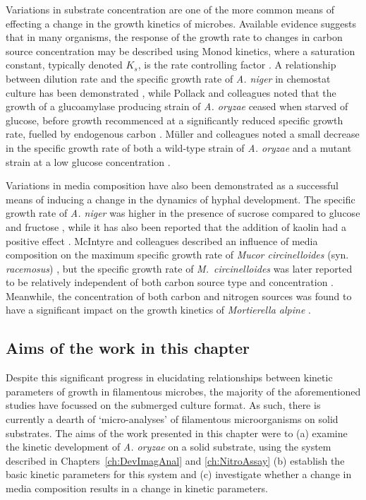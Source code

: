 Variations in substrate concentration are one of the more common means of effecting a change in the growth kinetics of microbes. Available evidence suggests that in many organisms, the response of the growth rate to changes in carbon source concentration may be described using Monod kinetics, where a saturation constant, typically denoted $K_s$, is the rate controlling factor \cite{spohr1998}. A relationship between dilution rate and the specific growth rate of \emph{A. niger} in chemostat culture has been demonstrated \cite{jorgensen2007}, while Pollack and colleagues noted that the growth of a glucoamylase producing strain of \emph{A. oryzae} ceased when starved of glucose, before growth recommenced at a significantly reduced specific growth rate, fuelled by endogenous carbon \cite{pollack2008}. M\"{u}ller and colleagues noted a small decrease in the specific growth rate of both a wild-type strain of \emph{A. oryzae} and a mutant strain at a low glucose concentration \cite{muller2002}.

Variations in media composition have also been demonstrated as a successful means of inducing a change in the dynamics of hyphal development. The specific growth rate of \emph{A. niger} was higher in the presence of sucrose compared to glucose and fructose \cite{bizukojc2006}, while it has also been reported that the addition of kaolin had a positive effect \cite{ali2006}. McIntyre and colleagues described an influence of media composition on the maximum specific growth rate of \emph{Mucor circinelloides} (syn. \emph{racemosus}) \cite{mcintyre2002}, but the specific growth rate of \emph{M.~circinelloides} was later reported to be relatively independent of both carbon source type and concentration \cite{lubbehusen2003}. Meanwhile, the concentration of both carbon and nitrogen sources was found to have a significant impact on the growth kinetics of \emph{Mortierella alpine} \cite{eypark2002}.

\subsection{Aims of the work in this chapter}

Despite this significant progress in elucidating relationships between kinetic parameters of growth in filamentous microbes, the majority of the aforementioned studies have focussed on the submerged culture format. As such, there is currently a dearth of \lq micro-analyses' of filamentous microorganisms on solid substrates. The aims of the work presented in this chapter were to (a) examine the kinetic development of \emph{A. oryzae} on a solid substrate, using the system described in Chapters~\ref{ch:DevImagAnal} and \ref{ch:NitroAssay} (b) establish the basic kinetic parameters for this system and (c) investigate whether a change in media composition results in a change in kinetic parameters.